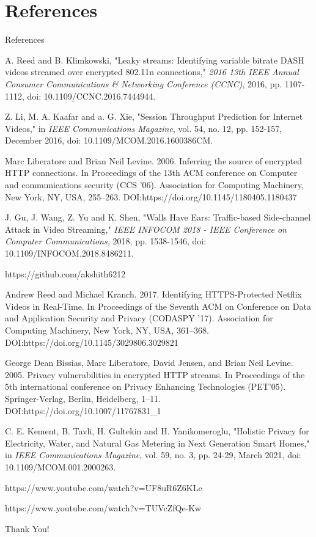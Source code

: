 \documentclass{beamer}
\begin{document}
\section{References}
\begin{frame}[allowframebreaks]{References}
    \footnotesize \color{black}
    \begin{thebibliography}{100}
         \color{black} A. Reed and B. Klimkowski, "Leaky streams: Identifying variable bitrate DASH videos streamed over encrypted 802.11n connections," \textit{2016 13th IEEE Annual Consumer Communications & Networking Conference (CCNC)}, 2016, pp. 1107-1112, doi: 10.1109/CCNC.2016.7444944.
        
         \color{black} Z. Li, M. A. Kaafar and a. G. Xie, "Session Throughput Prediction for Internet Videos," in \textit{IEEE Communications Magazine}, vol. 54, no. 12, pp. 152-157, December 2016, doi: 10.1109/MCOM.2016.1600386CM.
        
         \color{black} Marc Liberatore and Brian Neil Levine. 2006. Inferring the source of encrypted HTTP connections. In Proceedings of the 13th ACM conference on Computer and communications security (CCS '06). Association for Computing Machinery, New York, NY, USA, 255–263. DOI:https://doi.org/10.1145/1180405.1180437
        
         \color{black} J. Gu, J. Wang, Z. Yu and K. Shen, "Walls Have Ears: Traffic-based Side-channel Attack in Video Streaming," \textit{IEEE INFOCOM 2018 - IEEE Conference on Computer Communications,} 2018, pp. 1538-1546, doi: 10.1109/INFOCOM.2018.8486211. 
        
         \color{black}https://github.com/akshith6212 

         \color{black}Andrew Reed and Michael Kranch. 2017. Identifying HTTPS-Protected Netflix Videos in Real-Time. In Proceedings of the Seventh ACM on Conference on Data and Application Security and Privacy (CODASPY '17). Association for Computing Machinery, New York, NY, USA, 361–368. DOI:https://doi.org/10.1145/3029806.3029821 
    
         \color{black}George Dean Bissias, Marc Liberatore, David Jensen, and Brian Neil Levine. 2005. Privacy vulnerabilities in encrypted HTTP streams. In Proceedings of the 5th international conference on Privacy Enhancing Technologies (PET'05). Springer-Verlag, Berlin, Heidelberg, 1–11. DOI:https://doi.org/10.1007/11767831\_1 
        
         \color{black}C. E. Kement, B. Tavli, H. Gultekin and H. Yanikomeroglu, "Holistic Privacy for Electricity, Water, and Natural Gas Metering in Next Generation Smart Homes," in \textit{IEEE Communications Magazine}, vol. 59, no. 3, pp. 24-29, March 2021, doi: 10.1109/MCOM.001.2000263. 
        
         \color{black}https://www.youtube.com/watch?v=UF8uR6Z6KLc
        
         \color{black}https://www.youtube.com/watch?v=TUVcZfQe-Kw
    \end{thebibliography}
\end{frame}

\begin{frame}
    \vspace{1em}
    \centering \huge Thank You!
\end{frame}
\end{document}
